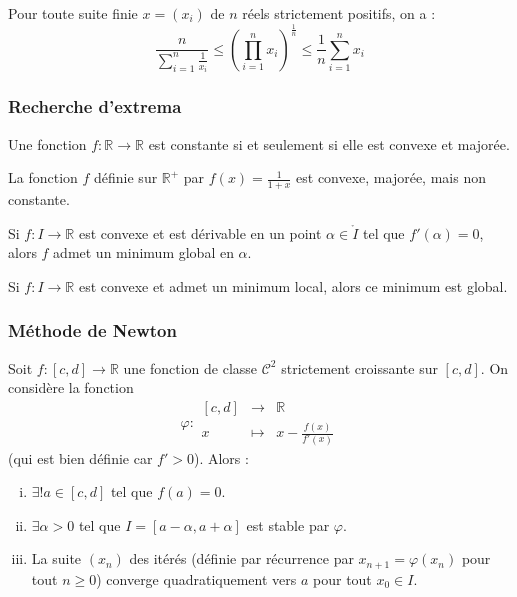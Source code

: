 	\begin{proposition}
		Pour toute suite finie $x = (x_i)$ de $n$ réels strictement positifs, on a :
		\[ \frac{n}{\sum_{i=1}^n \frac{1}{x_i}} \leq \left( \prod_{i=1}^n x_i \right)^{\frac{1}{n}} \leq \frac{1}{n} \sum_{i=1}^n x_i \]
	\end{proposition}

	\subsubsection{Recherche d'extrema}


	\begin{proposition}
		Une fonction $f : \mathbb{R} \rightarrow \mathbb{R}$ est constante si et seulement si elle est convexe et majorée.
	\end{proposition}

	\begin{cexample}
		La fonction $f$ définie sur $\mathbb{R}^+$ par $f(x) = \frac{1}{1+x}$ est convexe, majorée, mais non constante.
	\end{cexample}

	\begin{proposition}
		Si $f : I \rightarrow \mathbb{R}$ est convexe et est dérivable en un point $\alpha \in \mathring{I}$ tel que $f'(\alpha) = 0$, alors $f$ admet un minimum global en $\alpha$.
	\end{proposition}

	\begin{proposition}
		Si $f : I \rightarrow \mathbb{R}$ est convexe et admet un minimum local, alors ce minimum est global.
	\end{proposition}

	\subsubsection{Méthode de Newton}


	\begin{theorem}
		Soit $f : [c, d] \rightarrow \mathbb{R}$ une fonction de classe $\mathcal{C}^2$ strictement croissante sur $[c, d]$. On considère la fonction
		\[ \varphi :
		\begin{array}{ccc}
			[c, d] &\rightarrow& \mathbb{R} \\
			x &\mapsto& x - \frac{f(x)}{f'(x)}
		\end{array}
		\]
		(qui est bien définie car $f' > 0$). Alors :
		\begin{enumerate}[(i)]
			\item $\exists! a \in [c, d]$ tel que $f(a) = 0$.
			\item $\exists \alpha > 0$ tel que $I = [a - \alpha, a + \alpha]$ est stable par $\varphi$.
			\item La suite $(x_n)$ des itérés (définie par récurrence par $x_{n+1} = \varphi(x_n)$ pour tout $n \geq 0$) converge quadratiquement vers $a$ pour tout $x_0 \in I$.
		\end{enumerate}
	\end{theorem}

